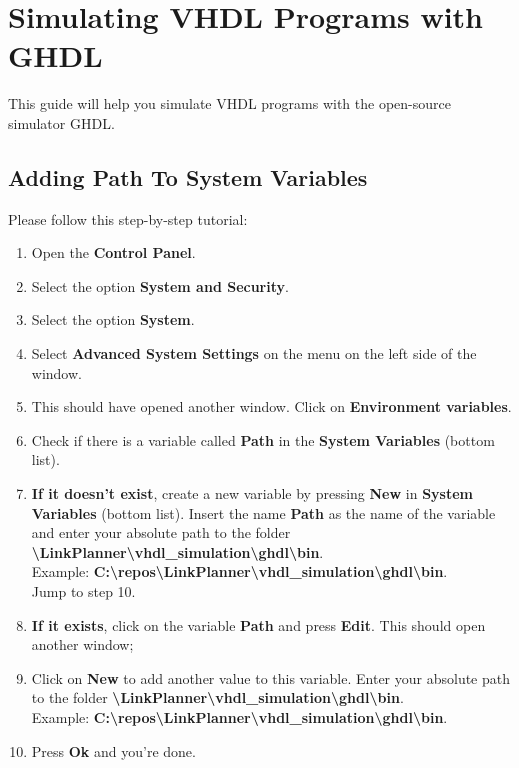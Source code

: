 \chapter{Simulating VHDL Programs with GHDL}

This guide will help you simulate VHDL programs with the open-source simulator GHDL.

\section{Adding Path To System Variables}
Please follow this step-by-step tutorial:
  \begin{enumerate}
    \item Open the \textbf{Control Panel}.
    \item Select the option \textbf{System and Security}.
    \item Select the option \textbf{System}.
    \item Select \textbf{Advanced System Settings} on the menu on the left side of the window.
    \item This should have opened another window. Click on \textbf{Environment variables}.
    \item Check if there is a variable called \textbf{Path} in the \textbf{System Variables} (bottom list).
    \item \textbf{If it doesn't exist}, create a new variable by pressing \textbf{New} in \textbf{System Variables} (bottom list). Insert the name \textbf{Path} as the name of the variable and enter your absolute path to the folder \textbf{\textbackslash{}LinkPlanner\textbackslash{}vhdl\_simulation\textbackslash{}ghdl\textbackslash{}bin}.\\ Example:
        \textbf{C:\textbackslash{}repos\textbackslash{}LinkPlanner\textbackslash{}vhdl\_simulation\textbackslash{}ghdl\textbackslash{}bin}.\\
          Jump to step 10.
    \item \textbf{If it exists}, click on the variable \textbf{Path} and press \textbf{Edit}. This should open another window;
    \item Click on \textbf{New} to add another value to this variable. Enter your absolute path to the folder \textbf{\textbackslash{}LinkPlanner\textbackslash{}vhdl\_simulation\textbackslash{}ghdl\textbackslash{}bin}.\\ Example:
        \textbf{C:\textbackslash{}repos\textbackslash{}LinkPlanner\textbackslash{}vhdl\_simulation\textbackslash{}ghdl\textbackslash{}bin}.\\
    \item Press \textbf{Ok} and you're done.
  \end{enumerate}
\pagebreak
